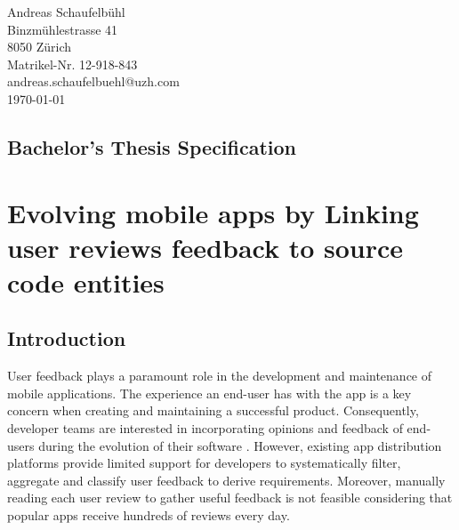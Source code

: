 \documentclass{task_description}
\begin{document}
\thispagestyle{firstpage}
\vspace*{23mm}%
\hfill\parbox[t]{65mm}{

Andreas Schaufelb\"uhl\\
Binzm\"uhlestrasse 41\\
8050 Z\"urich\\[5mm]
Matrikel-Nr. 12-918-843\\
andreas.schaufelbuehl@uzh.com\\[15mm]
\today \\
}
\vspace*{5mm}
\subsection*{Bachelor's Thesis Specification}
%

\section*{Evolving mobile apps by Linking  user reviews  feedback to source code entities\hspace{1em}}


%
\subsection*{Introduction}
%

User feedback plays a paramount role in the development and maintenance of mobile applications. The experience an end-user has with the app is a key concern when creating and maintaining a successful product. Consequently, developer teams are interested in incorporating opinions and feedback of end-users during the evolution of their software \cite{Krusche2014,Vithani2014}.
However, existing app distribution platforms provide limited support for developers to systematically filter, aggregate and classify user feedback to derive requirements. Moreover, manually reading each user review to gather useful feedback is not feasible considering that popular apps receive hundreds of reviews every day\cite{PaganoRE2013,Licorish2015}. 
\end{document}
